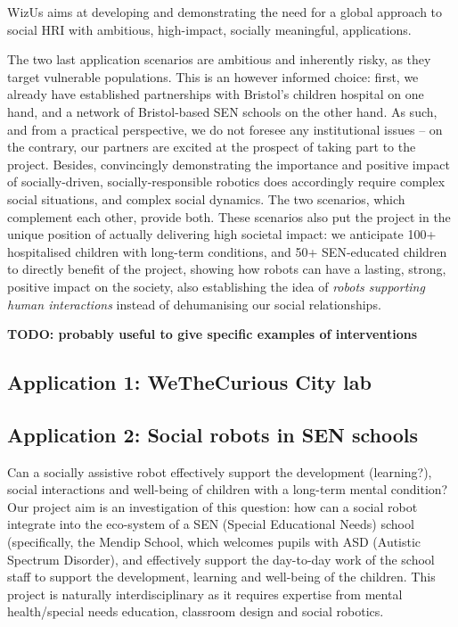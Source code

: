 \documentclass[11pt,a4paper]{report}
\newcommand{\project}{WizUs\xspace}
\newcommand{\TODO}[1]{{\color{red}\textbf{TODO: #1}}}
\begin{document}
\project aims at developing and demonstrating the need for a global approach to
social HRI with ambitious, high-impact, socially meaningful, applications.

The two last application scenarios are ambitious and inherently risky, as they
target vulnerable populations. This is an however informed choice: first, we
already have established partnerships with Bristol's children hospital on one
hand, and a network of Bristol-based SEN schools on the other hand. As such, and
from a practical perspective, we do not foresee any institutional issues -- on
the contrary, our partners are excited at the prospect of taking part to the
project. Besides, convincingly demonstrating the importance and positive impact
of socially-driven, socially-responsible robotics does accordingly require
complex social situations, and complex social dynamics. The two scenarios, which
complement each other, provide both. These scenarios also put the project in the
unique position of actually delivering high societal impact: we anticipate 100+
hospitalised children with long-term conditions, and 50+ SEN-educated children
to directly benefit of the project, showing how robots can have a lasting,
strong, positive impact on the society, also establishing the idea of
\emph{robots supporting human interactions} instead of dehumanising our social
relationships.


\TODO{probably useful to give specific examples of interventions}

\subsection{Application 1: WeTheCurious City lab}

\subsection{Application 2: Social robots in SEN schools}

Can a socially assistive robot effectively support the development (learning?),
social interactions and well-being of children with a long-term mental
condition? Our project aim is an investigation of this question: how can a
social robot integrate into the eco-system of a SEN (Special Educational Needs)
school (specifically, the Mendip School, which welcomes pupils with ASD
(Autistic Spectrum Disorder), and effectively support the day-to-day work of the
school staff to support the development, learning and well-being of the
children. This project is naturally interdisciplinary as it requires expertise
from mental health/special needs education, classroom design and social
robotics. 
\end{document}

